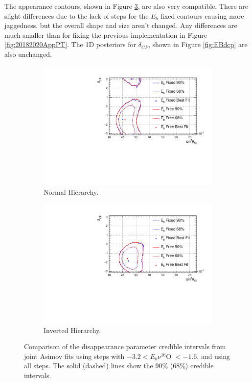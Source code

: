 The appearance contours, shown in Figure \ref{fig:EBApp}, are also very compatible. There are slight differences due to the lack of steps for the $E_b$ fixed contours causing more jaggedness, but the overall shape and size aren't changed. Any differences are much smaller than for fixing the previous implementation in Figure \ref{fig:20182020AppPT}. The 1D posteriors for $\delta_{CP}$, shown in Figure \ref{fig:EBdcp} are also unchanged. 

\begin{figure}[!htbp]
\centering
\begin{subfigure}{.7\textwidth}
  \centering
  \includegraphics[width=0.95\linewidth]{figs/compMaCh3Contours_EB_asimov/compMaCh3Contours_EB_app_asimovA_NH}
  \caption{Normal Hierarchy.}
  \label{fig:EBAppNH}
\end{subfigure}
\begin{subfigure}{.7\textwidth}
  \centering
  \includegraphics[width=0.95\linewidth]{figs/compMaCh3Contours_EB_asimov/compMaCh3Contours_EB_app_asimovA_IH}
  \caption{Inverted Hierarchy.}
  \label{fig:EBAppIH}
\end{subfigure}
\caption{Comparison of the disappearance parameter credible intervals from joint Asimov fits using steps with $ -3.2 < E_b \nu ^{16}$O $< -1.6$, and using all steps. The solid (dashed) lines show the 90$\%$ ($68\%$) credible intervals.}
\label{fig:EBApp}
\end{figure}


